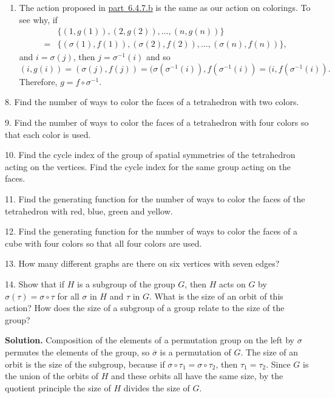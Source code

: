\documentclass[10pt,]{book}
\theoremstyle{plain}
\theoremstyle{definition}
\theoremstyle{definition}
\numberwithin{equation}{chapter}
\begin{document}
\begin{exerciselist}
\begin{enumerate}[label=(\alph*)]
\item\hypertarget{li-126}{}The action proposed in \hyperlink{group-act-comp}{part~6.4.7.b} is the same as our action on colorings. To see why, if%
\begin{align*}
&\{(1,g(1)),(2,g(2)),\dots,(n,g(n))\}\\
=&\{(\sigma(1),f(1)),(\sigma(2),f(2)),\dots,(\sigma(n),f(n))\}\text{,}
\end{align*}
and \(i=\sigma(j)\), then \(j=\sigma^{-1}(i)\) and so%
\begin{equation*}
(i,g(i)) = (\sigma(j),f(j)) = (\sigma(\sigma^{-1}(i)),f(\sigma^{-1}(i)) = (i,f(\sigma^{-1}(i))\text{.}
\end{equation*}
Therefore, \(g=f\circ \sigma^{-1}\).%
\end{enumerate}
%
\item[8.]\hypertarget{exercise-61}{}Find the number of ways to color the faces of a tetrahedron with two colors.%
\par\smallskip
\item[9.]\hypertarget{exercise-62}{}Find the number of ways to color the faces of a tetrahedron with four colors so that each color is used.%
\par\smallskip
\item[10.]\hypertarget{exercise-63}{}Find the cycle index of the group of spatial symmetries of the tetrahedron acting on the vertices.  Find the cycle index for the same group acting on the faces.%
\par\smallskip
\item[11.]\hypertarget{exercise-64}{}Find the generating function for the number of ways to color the faces of the tetrahedron with red, blue, green and yellow.%
\par\smallskip
\item[12.]\hypertarget{exercise-65}{}Find the generating function for the number of ways to color the faces of a cube with four colors so that all four colors are used.%
\par\smallskip
\item[13.]\hypertarget{exercise-66}{}How many different graphs are there on six vertices with seven edges?%
\par\smallskip
\item[14.]\hypertarget{exercise-67}{}Show that if \(H\) is a subgroup of the group \(G\), then \(H\) acts on \(G\) by \(\sigma(\tau) = \sigma\circ\tau\) for all \(\sigma\) in \(H\) and \(\tau\) in \(G\). What is the size of an orbit of this action? How does the size of a subgroup of a group relate to the size of the group?%
\par\smallskip
\par\smallskip
\noindent\textbf{Solution.}\hypertarget{solution-527}{}\quad
Composition of the elements of a permutation group on the left by \(\sigma\) permutes the elements of the group, so \(\overline{\sigma}\) is a permutation of \(G\). The size of an orbit is the size of the subgroup, because if \(\sigma\circ\tau_1 = \sigma\circ\tau_2\), then \(\tau_1 = \tau_2\). Since \(G\) is the union of the orbits of \(H\) and these orbits all have the same size, by the quotient principle the size of \(H\) divides the size of \(G\).%
\end{exerciselist}
\end{document}
